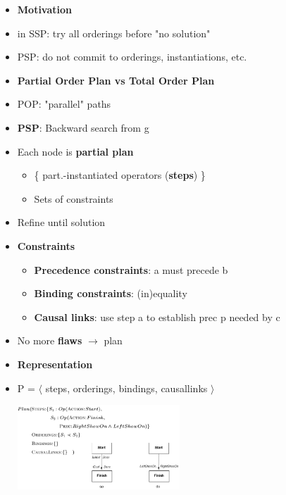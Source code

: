 \begin{itemize}
\item \textbf{Motivation}
\item in SSP: try all orderings before "no solution"
\item PSP: do not commit to orderings, instantiations, etc.

\item \textbf{Partial Order Plan vs Total Order Plan}
\item POP: "parallel" paths

\item \textbf{PSP}: Backward search from g
\item Each node is \textbf{partial plan}
	\begin{itemize}
	\item \{ part.-instantiated operators (\textbf{steps}) \}
	\item Sets of constraints
	\end{itemize}
\item Refine until solution

\item \textbf{Constraints}
	\begin{itemize}
	\item \textbf{Precedence constraints}: a must precede b
	\item \textbf{Binding constraints}: (in)equality
	\item \textbf{Causal links}: use step a to establish prec p needed by c
	\end{itemize}
\item No more \textbf{flaws} $\rightarrow$ plan

\item \textbf{Representation}
\item P = $\langle$ steps, orderings, bindings, causallinks $\rangle$

\includegraphics[width=0.48\textwidth]{./img/psp_representation.png}

\end{itemize}